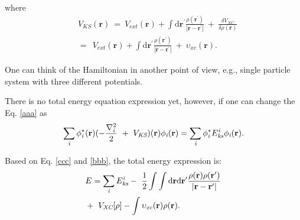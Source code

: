 \documentclass[a4paper, 12pt, titlepage,oneside,drop]{kthesis}
\begin{document}
\noindent where
\begin{equation}\begin{split}
&\ V_\textit{KS}(\textbf{r}) \ = \ V_\textit{ext}(\textbf{r}) + \int \mathrm{d}{\textbf{r}^{\prime}}  \frac{\rho(\textbf{r}^{\prime})}{|{\textbf{r}}-{\textbf{r}}^{\prime}|} \ + \ \frac{\delta{V_\textit{XC}}}{\delta{\rho(\textbf{r})}} \\
&\ = \ \ V_\textit{ext}(\textbf{r}) + \int \mathrm{d}{\textbf{r}^{\prime}}  \frac{\rho(\textbf{r}^{\prime})}{|{\textbf{r}}-{\textbf{r}}^{\prime}|} \ + \ \upsilon_\textit{xc}(\textbf{r}).
\end{split}
\end{equation}

\noindent One can think of the Hamiltonian in another point of view, e.g., single particle system with three different potentials. 

\noindent There is no total energy equation expression yet, however, if one can change the Eq. \ref{aaa} as 
\begin{equation}\label{bbb}
\sumi<i> \phi^{*}_{\textit{i}}(\textbf{r})(-\frac{\nabla^{2}_{i}}{2}\ + \ V_\textit{KS})(\textbf{r}) \phi_{\textit{i}}(\textbf{r}) = \sumi<i> \phi^{*}_{\textit{i}}E_{\textit{ks}}^{\textit{i}} \phi_{\textit{i}}(\textbf{r}).
\end{equation}

\noindent Based on Eq. \ref{ccc} and \ref{bbb}, the total energy expression is:
\begin{equation}\label{totalenergy}
\begin{split}
& E= \sumi<i> E_{\textit{ks}}^{\textit{i}} - \ \frac{1}{2} \int \int \mathrm{d} {\textbf{r}} \mathrm{d}{\textbf{r}^{\prime}} \frac{\rho({\textbf{r}})\rho(\textbf{r}^{\prime})}{|{\textbf{r}}-{\textbf{r}}^{\prime}|} \\
&    + \ V_\textit{XC}[\rho] - \int   \upsilon_\textit{xc}(\textbf{r}) \rho({\textbf{r}}).
\end{split}
\end{equation}
\end{document}
